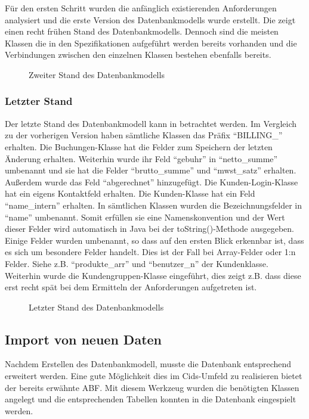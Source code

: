 Für den ersten Schritt wurden die anfänglich existierenden Anforderungen analysiert und die erste Version des Datenbankmodells wurde erstellt. 
Die  zeigt einen recht frühen Stand des Datenbankmodells.
Dennoch sind die meisten Klassen die in den Spezifikationen aufgeführt werden bereits vorhanden und die Verbindungen zwischen den einzelnen Klassen bestehen ebenfalls bereits. 

\begin{sidewaysfigure}
	\centering
	\caption{Zweiter Stand des Datenbankmodells}
	\label{fig:db-two}
\end{sidewaysfigure}

\subsubsection{Letzter Stand}
Der letzte Stand des Datenbankmodell kann in  betrachtet werden.
Im Vergleich zu der vorherigen Version haben sämtliche Klassen das Präfix "`BILLING\_"' erhalten.
Die Buchungen-Klasse hat die Felder zum Speichern der letzten Änderung erhalten.
Weiterhin wurde ihr Feld "`gebuhr"' in "`netto\_summe"' umbenannt und sie hat die Felder "`brutto\_summe"' und "`mwst\_satz"' erhalten. Außerdem wurde das Feld "`abgerechnet"' hinzugefügt.
Die Kunden-Login-Klasse hat ein eigens Kontaktfeld erhalten.
Die Kunden-Klasse hat ein Feld "`name\_intern"' erhalten.
In sämtlichen Klassen wurden die Bezeichnungsfelder in "`name"' umbenannt. Somit erfüllen sie eine Namenskonvention und der Wert dieser Felder wird automatisch in Java bei der toString()-Methode ausgegeben.
Einige Felder wurden umbenannt, so dass auf den ersten Blick erkennbar ist, dass es sich um besondere Felder handelt. Dies ist der Fall bei Array-Felder oder 1:n Felder. Siehe z.B. "`produkte\_arr"' und "`benutzer\_n"' der Kundenklasse.
Weiterhin wurde die Kundengruppen-Klasse eingeführt, dies zeigt z.B. dass diese erst recht spät bei dem Ermitteln der Anforderungen aufgetreten ist. 
\begin{sidewaysfigure}
	\centering
	\caption{Letzter Stand des Datenbankmodells}
	\label{fig:db-final}
\end{sidewaysfigure}

\subsection{Import von neuen Daten}
Nachdem Erstellen des Datenbankmodell, musste die Datenbank entsprechend erweitert werden.
Eine gute Möglichkeit dies im Cids-Umfeld zu realisieren bietet der bereits erwähnte \ac{ABF}. Mit diesem Werkzeug wurden die benötigten Klassen angelegt und die entsprechenden Tabellen konnten in die Datenbank eingespielt werden.

